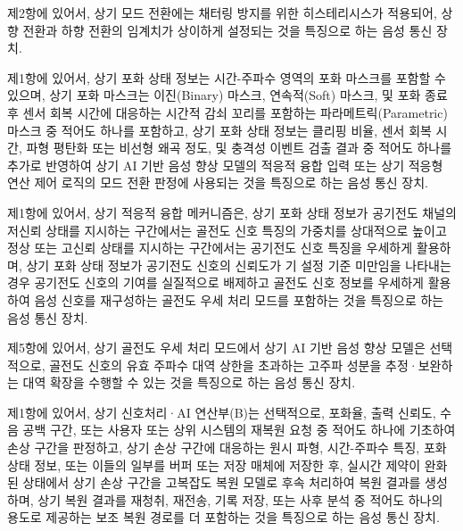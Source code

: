 \documentclass{article}
\DeclareRobustCommand{\codexedit}[1]{\textcolor{customorange}{#1}}
\DeclareRobustCommand{\vtwoedit}[1]{\textcolor{customgreen}{#1}}
\begin{document}
\begin{enumerate}[label=\textbf{[\arabic*]}]
    \item \codexedit{제2항에 있어서,
    상기 모드 전환에는 채터링 방지를 위한 히스테리시스가 적용되어, 상향 전환과 하향 전환의 임계치가 상이하게 설정되는 것을 특징으로 하는 음성 통신 장치.}

    \item \codexedit{제1항에 있어서,
    \vtwoedit{상기 포화 상태 정보는 시간-주파수 영역의 포화 마스크를 포함할 수 있으며,}
    \vtwoedit{상기 포화 마스크는 이진(Binary) 마스크, 연속적(Soft) 마스크, 및 포화 종료 후 센서 회복 시간에 대응하는 시간적 감쇠 꼬리를 포함하는 파라메트릭(Parametric) 마스크 중 적어도 하나를 포함하고,}
    \vtwoedit{상기 포화 상태 정보는 클리핑 비율, 센서 회복 시간, 파형 평탄화 또는 비선형 왜곡 정도, 및 충격성 이벤트 검출 결과 중 적어도 하나를 추가로 반영하여 상기 AI 기반 음성 향상 모델의 적응적 융합 입력 또는 상기 적응형 연산 제어 로직의 모드 전환 판정에 사용되는 것을 특징으로 하는 음성 통신 장치.}}

    \item \codexedit{제1항에 있어서,
    \vtwoedit{상기 적응적 융합 메커니즘은, 상기 포화 상태 정보가 공기전도 채널의 저신뢰 상태를 지시하는 구간에서는 골전도 신호 특징의 가중치를 상대적으로 높이고 정상 또는 고신뢰 상태를 지시하는 구간에서는 공기전도 신호 특징을 우세하게 활용하며,}
    \vtwoedit{상기 포화 상태 정보가 공기전도 신호의 신뢰도가 기 설정 기준 미만임을 나타내는 경우 공기전도 신호의 기여를 실질적으로 배제하고 골전도 신호 정보를 우세하게 활용하여 음성 신호를 재구성하는 골전도 우세 처리 모드를 포함하는 것을 특징으로 하는 음성 통신 장치.}}

    \item \codexedit{제5항에 있어서,
    상기 골전도 우세 처리 모드에서 상기 AI 기반 음성 향상 모델은 선택적으로, 골전도 신호의 유효 주파수 대역 상한을 초과하는 고주파 성분을 추정·보완하는 대역 확장을 수행할 수 있는 것을 특징으로 하는 음성 통신 장치.}

    \item \codexedit{제1항에 있어서,
    상기 신호처리·AI 연산부(B)는 선택적으로,
    포화율, 출력 신뢰도, 수음 공백 구간, 또는 사용자 또는 상위 시스템의 재복원 요청 중 적어도 하나에 기초하여 손상 구간을 판정하고,
    상기 손상 구간에 대응하는 원시 파형, 시간-주파수 특징, \vtwoedit{포화 상태 정보}, 또는 이들의 일부를 버퍼 또는 저장 매체에 저장한 후,
    \vtwoedit{실시간 제약이 완화된 상태에서} 상기 손상 구간을 고복잡도 복원 모델로 후속 처리하여 복원 결과를 생성하며,
    상기 복원 결과를 재청취, 재전송, 기록 저장, 또는 사후 분석 중 적어도 하나의 용도로 제공하는 보조 복원 경로를 더 포함하는 것을 특징으로 하는 음성 통신 장치.}


\end{enumerate}
\end{document}
